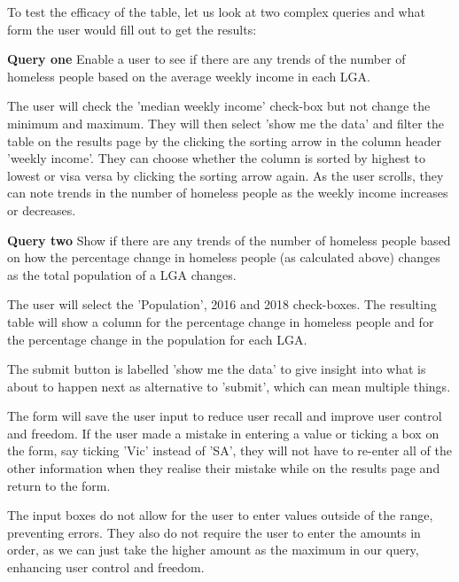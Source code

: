 \documentclass[12pt, a4paper]{article}
\begin{document}
To test the efficacy of the table, let us look at two complex queries and what form the user would fill out to get the results: 

\textbf{Query one} Enable a user to see if there are any trends of the number of homeless people based on the average weekly income in each LGA. 

The user will check the 'median weekly income' check-box but not change the minimum and maximum. They will then select 'show me the data' and filter the table on the results page by the clicking the sorting arrow in the column header 'weekly income'. They can choose whether the column is sorted by highest to lowest or visa versa by clicking the sorting arrow again. As the user scrolls, they can note trends in the number of homeless people as the weekly income increases or decreases. 

\textbf{Query two} Show if there are any trends of the number of homeless people based on how the percentage change in homeless people (as calculated above) changes as the total population of a LGA changes. 

The user will select the 'Population', 2016 and 2018 check-boxes. The resulting table will show a column for the percentage change in homeless people and for the percentage change in the population for each LGA.

The submit button is labelled 'show me the data' to give insight into what is about to happen next as alternative to 'submit', which can mean multiple things.

The form will save the user input to reduce user recall and improve user control and freedom. If the user made a mistake in entering a value or ticking a box on the form, say ticking 'Vic' instead of 'SA', they will not have to re-enter all of the other information when they realise their mistake while on the results page and return to the form. 

The input boxes do not allow for the user to enter values outside of the range, preventing errors. They also do not require the user to enter the amounts in order, as we can just take the higher amount as the maximum in our query, enhancing user control and freedom.
\end{document}
